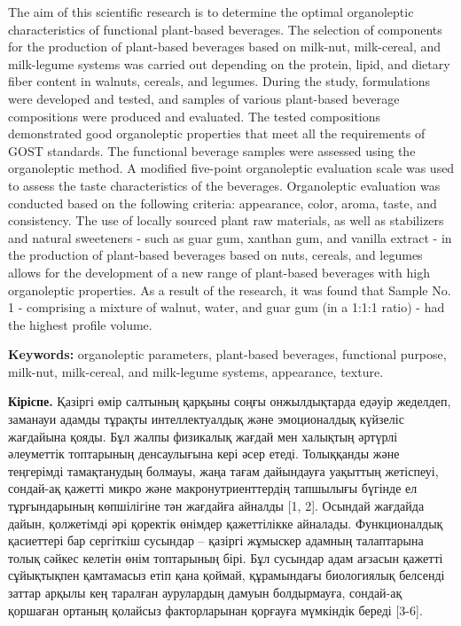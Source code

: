 {The aim of this scientific research is to determine the optimal
organoleptic characteristics of functional plant-based beverages. The
selection of components for the production of plant-based beverages
based on milk-nut, milk-cereal, and milk-legume systems was carried out
depending on the protein, lipid, and dietary fiber content in walnuts,
cereals, and legumes. During the study, formulations were developed and
tested, and samples of various plant-based beverage compositions were
produced and evaluated. The tested compositions demonstrated good
organoleptic properties that meet all the requirements of GOST
standards. The functional beverage samples were assessed using the
organoleptic method. A modified five-point organoleptic evaluation scale
was used to assess the taste characteristics of the beverages.
Organoleptic evaluation was conducted based on the following criteria:
appearance, color, aroma, taste, and consistency. The use of locally
sourced plant raw materials, as well as stabilizers and natural
sweeteners - such as guar gum, xanthan gum, and vanilla extract - in the
production of plant-based beverages based on nuts, cereals, and legumes
allows for the development of a new range of plant-based beverages with
high organoleptic properties. As a result of the research, it was found
that Sample No. 1 - comprising a mixture of walnut, water, and guar gum
(in a 1:1:1 ratio) - had the highest profile volume.

{\bfseries Keywords:} organoleptic parameters, plant-based beverages,
functional purpose, milk-nut, milk-cereal, and milk-legume systems,
appearance, texture.

{\bfseries Кіріспе.} Қазіргі өмір салтының қарқыны соңғы онжылдықтарда
едәуір жеделдеп, заманауи адамды тұрақты интеллектуалдық және
эмоционалдық күйзеліс жағдайына қояды. Бұл жалпы физикалық жағдай мен
халықтың әртүрлі әлеуметтік топтарының денсаулығына кері әсер етеді.
Толыққанды және теңгерімді тамақтанудың болмауы, жаңа тағам дайындауға
уақыттың жетіспеуі, сондай-ақ қажетті микро және макронутриенттердің
тапшылығы бүгінде ел тұрғындарының көпшілігіне тән жағдайға айналды
{[}1, 2{]}. Осындай жағдайда дайын, қолжетімді әрі қоректік өнімдер
қажеттілікке айналады. Функционалдық қасиеттері бар сергіткіш сусындар
-- қазіргі жұмыскер адамның талаптарына толық сәйкес келетін өнім
топтарының бірі. Бұл сусындар адам ағзасын қажетті сұйықтықпен
қамтамасыз етіп қана қоймай, құрамындағы биологиялық белсенді заттар
арқылы кең таралған аурулардың дамуын болдырмауға, сондай-ақ қоршаған
ортаның қолайсыз факторларынан қорғауға мүмкіндік береді {[}3-6{]}.

}
